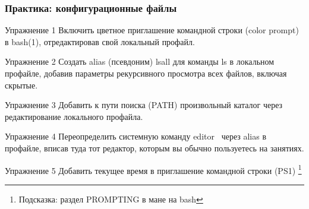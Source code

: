 \begin{frame}
  \frametitle{Практика: конфигурационные файлы}

  \alert{Упражнение 1} Включить цветное приглашение командной строки (color prompt) в bash(1), отредактировав свой локальный профайл.

  \alert{Упражнение 2} Создать alias (псевдоним) lsall для команды ls в локальном профайле, добавив параметры рекурсивного просмотра всех файлов, включая скрытые.

  \alert{Упражнение 3} Добавить к пути поиска (PATH) произвольный каталог через редактирование локального профайла.

  \alert{Упражнение 4} Переопределить системную команду \textquotedbl editor \textquotedbl\ через alias в профайле, вписав туда тот редактор, которым вы обычно пользуетесь на занятиях.

  \alert{Упражнение 5} Добавить текущее время в приглашение командной строки (PS1) \footnote{Подсказка: раздел PROMPTING в мане на bash}

\end{frame}
